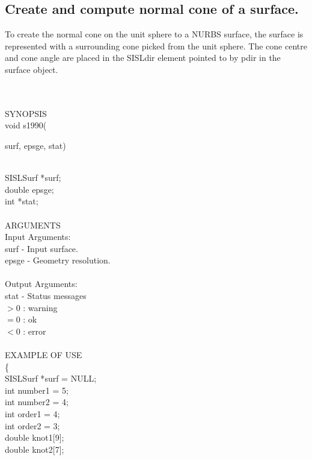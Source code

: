 \subsection{Create and compute normal cone of a surface.}
\begin{minipg1}
		To create the normal cone on the unit sphere to
	       	a NURBS surface, the surface is represented with
	       	a surrounding cone picked from the unit sphere. The cone centre and cone angle are placed in the SISLdir element pointed to by pdir in the surface object.
\end{minipg1} \\ \\
SYNOPSIS\\
	\>void s1990(\begin{minipg3}
		surf, epsge, stat)
		\end{minipg3}\\[0.3ex]
		\>\>	SISLSurf 	\>	*{\fov surf};\\
		\>\>	double 	\>	{\fov epsge};\\
		\>\>	int 	\>	*{\fov stat};\\
\\
ARGUMENTS\\
	\>Input Arguments:\\
	\>\>	{\fov surf}	\> - \>	Input surface.\\
	\>\>	{\fov epsge}	\> - \>	Geometry resolution.\\
\\
	\>Output Arguments:\\
	\>\>	{\fov stat}	\> - \>	Status messages\\
		\>\>\>\>\>		$> 0$	: warning\\
		\>\>\>\>\>		$= 0$	: ok\\
		\>\>\>\>\>		$< 0$	: error\\
\\
EXAMPLE OF USE\\
		\>	\{ \\
  		\>\>	SISLSurf    \>	*{\fov surf} = NULL;\\
  		\>\>	int    \>	{\fov number1} = 5;\\
		\>\>	int    \>	{\fov number2} = 4;\\
  		\>\>	int    \>	{\fov order1} = 4;\\
		\>\>	int    \>	{\fov order2} = 3;\\
  		\>\>	double \>	{\fov knot1[9]};\\
		\>\>	double \>	{\fov knot2[7]};\\
